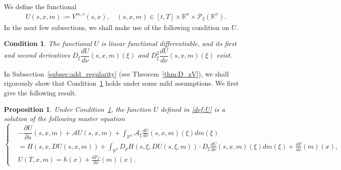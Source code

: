 \documentclass[11pt]{article}
\numberwithin{equation}{section}
\newtheorem{proposition}[theorem]{Proposition}
\newtheorem{condition}{Condition}[section]
\newcommand{\pr}{\mathcal{P}}
\newcommand{\brn}{{\mathbb{R}^n}}
\newcommand{\1}{\mbox{1\hspace{-1mm}I}}
\begin{document}
We define the functional 
\begin{align}\label{def:U}
    U(s,x,m):=V^{m,s}(s,x),\quad (s,x,m)\in[t,T]\times\brn\times\pr_2(\brn).
\end{align}
In the next few subsections, we shall make use of the following condition on $U$.
\begin{condition}\label{Condition:U}
    The functional $U$ is linear functional differentiable, and its first and second derivatives $D_{\xi}\dfrac{dU}{d\nu}(s,x,m)(\xi)$ and $D_{\xi}^{2}\dfrac{dU}{d\nu}(s,x,m)(\xi)$ exist.
\end{condition}
In Subsection~\ref{subsec:add_regularity} (see Theorem~\ref{thm:D_zV}), we shall rigorously show that Condition~\ref{Condition:U} holds under some mild assumptions. We first give the following result.

\begin{proposition}\label{prop:6-1}
Under Condition~\ref{Condition:U}, the function $U$ defined in \eqref{def:U} is a solution of the following master equation 
\begin{equation}\label{eq:6-1}
    \left\{
        \begin{aligned}
            &-\dfrac{\partial U}{\partial s}(s,x,m)+\mathcal{A}U(s,x,m)+\int_{\brn}\mathcal{A}_\xi \frac{dU}{d\nu}(s,x,m)(\xi)dm(\xi)\\
            &=H\left(s,x,DU(s,x,m)\right)+\int_{\brn}D_p H \left(s,\xi,DU(s,\xi,m)\right)\cdot D_\xi\frac{dU}{d\nu}(s,x,m)(\xi) dm(\xi)+
            \frac{dF}{d\nu}(m)(x),\\
            &U(T,x,m)=h(x)+\frac{dF_T}{d\nu}(m)(x).
        \end{aligned}
    \right.
\end{equation} 
\end{proposition}
\end{document}
